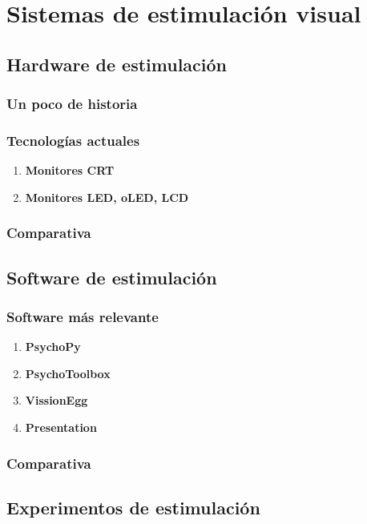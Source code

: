 \documentclass[../main.tex]{subfiles}
\begin{document}
\section{Sistemas de estimulación visual}
\label{sec:02_sistemas_de_estimulación_visual}
	\subsection{Hardware de estimulación}
	\label{sub:02_hardware_de_estimulación}
		\subsubsection{Un poco de historia} 
		\label{ssub:02_un_poco_de_historia}

		\subsubsection{Tecnologías actuales} 
		\label{ssub:02_tecnologías_actuales}
			\begin{enumerate}
				\item \textbf{Monitores CRT}

				\item \textbf{Monitores LED, oLED, LCD}

			\end{enumerate}

		\subsubsection{Comparativa}
		\label{ssub:02_comparativa_monitores}
		

	\subsection{Software de estimulación}
	\label{sub:02_software_de_estimulación}
		\subsubsection{Software más relevante}
		\label{ssub:02_software_más_relevante}
			\begin{enumerate}
				\item \textbf{PsychoPy}

				\item \textbf{PsychoToolbox}

				\item \textbf{VissionEgg}

				\item \textbf{Presentation}

			\end{enumerate}

		\subsubsection{Comparativa}
		\label{ssub:02_comparativa_software}

	\subsection{Experimentos de estimulación}
	\label{sub:02_experimentos_de_estimulación}
\end{document}
